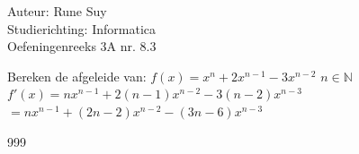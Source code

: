 \documentclass[a4paper]{article}
\begin{document}
  
\noindent \large Auteur: Rune Suy \\
\noindent \large Studierichting: Informatica\\
\noindent \large Oefeningenreeks 3A nr. 8.3\\

\medskip

\normalsize

Bereken de afgeleide van: $f(x) = x^n + 2x^{n-1} - 3x^{n-2}$ $ n \in \mathbb{N} $ \\

$f'(x) = nx^{n-1} + 2(n-1)x^{n-2} - 3(n-2)x^{n-3}$\\ 

$ = nx^{n-1} + (2n-2)x^{n-2} - (3n-6)x^{n-3}$\\

\begin{thebibliography}{999}
\end{thebibliography}
\end{document}

